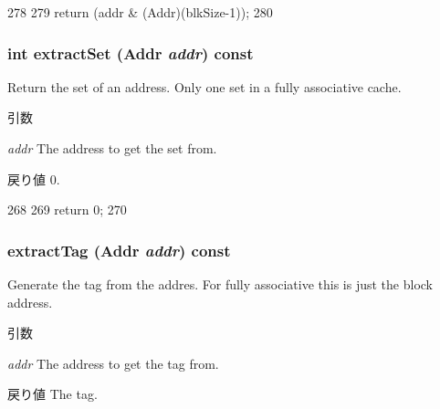 \begin{DoxyCode}
278     {
279         return (addr & (Addr)(blkSize-1));
280     }
\end{DoxyCode}
\hypertarget{classFALRU_a8fdcc1372cb0a5d8e1933bdb0bf7d680}{
\subsubsection[{extractSet}]{\setlength{\rightskip}{0pt plus 5cm}int extractSet ({\bf Addr} {\em addr}) const}}
\label{classFALRU_a8fdcc1372cb0a5d8e1933bdb0bf7d680}
Return the set of an address. Only one set in a fully associative cache. 
\begin{DoxyParams}{引数}
\item[{\em addr}]The address to get the set from. \end{DoxyParams}
\begin{DoxyReturn}{戻り値}
0. 
\end{DoxyReturn}



\begin{DoxyCode}
268     {
269         return 0;
270     }
\end{DoxyCode}
\hypertarget{classFALRU_a3a855eb5b0d8adbf737f25baa15a3d7b}{
\subsubsection[{extractTag}]{ extractTag ({\bf Addr} {\em addr}) const}}
\label{classFALRU_a3a855eb5b0d8adbf737f25baa15a3d7b}
Generate the tag from the addres. For fully associative this is just the block address. 
\begin{DoxyParams}{引数}
\item[{\em addr}]The address to get the tag from. \end{DoxyParams}
\begin{DoxyReturn}{戻り値}
The tag. 
\end{DoxyReturn}



